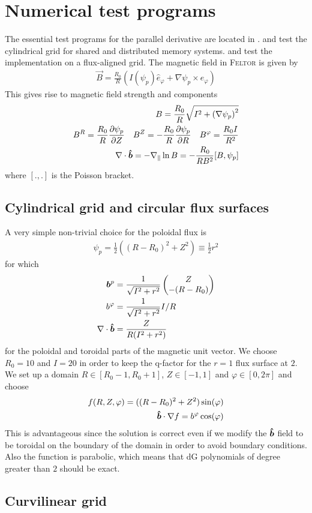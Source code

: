 \section{Numerical test programs}
The essential test programs for the parallel derivative are located in
.
 and  test the cylindrical grid for shared and distributed memory
systems.  and  test the implementation
on a flux-aligned grid.
The magnetic field in \textsc{Feltor} is given by
\begin{align}
  \vec B = \frac{R_0}{R}( I(\psi_p) \hat e_\varphi + \nabla\psi_p \times\hat e_\varphi)
\end{align}
This gives rise to magnetic field strength and components
\begin{align}
  B = \frac{R_0}{R} \sqrt{ I^2 + \left( \nabla\psi_p \right)^2} \\
  B^R = \frac{R_0}{R}\frac{\partial\psi_p}{\partial Z} \quad
  B^Z = -\frac{R_0}{R}\frac{\partial\psi_p}{\partial R}\quad 
  B^\varphi = \frac{R_0I}{R^2} \\
  \nabla \cdot\bm{\hat{b}} = -\nabla_\parallel \ln B = -\frac{R_0}{RB^2} [B, \psi_p]  
  \label{}
\end{align}
where $[.,.]$ is the Poisson bracket.
\subsection{Cylindrical grid and circular flux surfaces}
A very simple non-trivial choice for the poloidal flux is
\begin{align}
  \psi_p = \frac{1}{2} \left( (R-R_0)^2 + Z^2 \right) \equiv \frac{1}{2} r^2
  \label{eq:circular}
\end{align}
for which
\begin{align}
  {\boldsymbol{b}}^p &= \frac{1}{\sqrt{I^2 + r^2}} \begin{pmatrix} Z \\ -(R-R_0)\end{pmatrix} \\
  b^\varphi &= \frac{1}{\sqrt{I^2 + r^2}} I/R \\
  \nabla\cdot \bm{\hat{b}} &= \frac{Z}{R(I^2 + r^2)}
  \label{}
\end{align}
for the poloidal and toroidal parts of the magnetic unit vector.
We choose $R_0 = 10$ and $I=20$ in order to keep the q-factor for the $r=1$ flux surface at $2$.
We set up a domain
$R\in[R_0-1, R_0+1]$,
$Z\in[-1,1]$ and
$\varphi \in [0,2\pi]$ and choose
\begin{align}
  f(R,Z,\varphi) = ((R-R_0)^2 + Z^2)\sin(\varphi)\\
  \bm{\hat{b}} \cdot \nabla f= b^\varphi \cos(\varphi)
  \label{}
\end{align}
This is advantageous since the solution is correct even if we modify the $\bm{\hat{b}}$ field
to be toroidal on the boundary of the domain in order to avoid boundary conditions.
Also the function is parabolic, which means that dG polynomials of degree greater than $2$
should be exact.
\subsection{Curvilinear grid}










